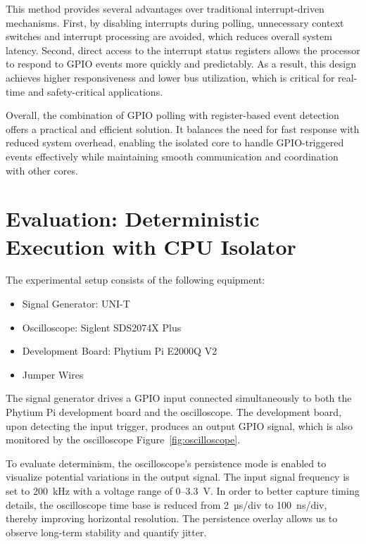\documentclass[letterpaper]{article}
\begin{document}
This method provides several advantages over traditional interrupt-driven mechanisms. First,
by disabling interrupts during polling, unnecessary context switches and interrupt processing
are avoided, which reduces overall system latency. Second, direct access to the interrupt status
registers allows the processor to respond to GPIO events more quickly and predictably. As a result,
this design achieves higher responsiveness and lower bus utilization, which is critical for
real-time and safety-critical applications.

Overall, the combination of GPIO polling with register-based event detection offers a practical
and efficient solution. It balances the need for fast response with reduced system overhead,
enabling the isolated core to handle GPIO-triggered events effectively while maintaining smooth
communication and coordination with other cores.


\section{Evaluation: Deterministic Execution with CPU Isolator}

The experimental setup consists of the following equipment:  
\begin{itemize}
  \item Signal Generator: UNI-T  
  \item Oscilloscope: Siglent SDS2074X Plus  
  \item Development Board: Phytium Pi E2000Q V2  
  \item Jumper Wires  
\end{itemize}

The signal generator drives a GPIO input connected simultaneously to both the Phytium Pi development board and the oscilloscope. The development board, upon detecting the input trigger, produces an output GPIO signal, which is also monitored by the oscilloscope Figure~\ref{fig:oscilloscope}.  

To evaluate determinism, the oscilloscope’s persistence mode is enabled to visualize potential variations in the output signal. The input signal frequency is set to 200~kHz with a voltage range of 0--3.3~V. In order to better capture timing details, the oscilloscope time base is reduced from 2~µs/div to 100~ns/div, thereby improving horizontal resolution. The persistence overlay allows us to observe long-term stability and quantify jitter.
\end{document}
